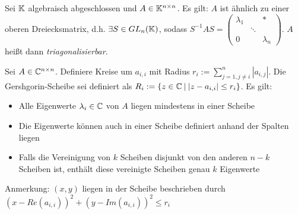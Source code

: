 \begin{satz}
	Sei $\mathbb{K}$ algebraisch abgeschlossen und $A \in \mathbb{K}^{n \times n}$. Es gilt: $A$ ist ähnlich zu einer oberen Dreiecksmatrix, d.h. $\exists S \in GL_n(\mathbb{K})$, sodass $S^{-1} A S = \left( \begin{smallmatrix} 
	\lambda_1 & & * \\
	& \ddots & \\
	0 & & \lambda_n
	\end{smallmatrix} \right)$. $A$ heißt dann \emph{triagonalisierbar}.
\end{satz}

\begin{satz}
	Sei $A \in \mathbb{C}^{n \times n}$. Definiere Kreise um $a_{i,i}$ mit Radius $r_i := \sum_{j = 1, j \neq i}^n |a_{i, j}|$. Die Gershgorin-Scheibe sei definiert als $R_i := \{z \in \mathbb{C} \medspace | \medspace |z -a_{i,i}| \leq r_i\}$. Es gilt:\begin{itemize}[noitemsep]
		\item Alle Eigenwerte $\lambda_i \in \mathbb{C} $ von $A$ liegen mindestens in einer Scheibe
		\item Die Eigenwerte können auch in einer Scheibe definiert anhand der Spalten liegen
		\item Falls die Vereinigung von $k$ Scheiben disjunkt von den anderen $n-k$ Scheiben ist, enthält diese vereinigte Scheiben genau $k$ Eigenwerte
	\end{itemize}

	Anmerkung: $(x,y)$ liegen in der Scheibe beschrieben durch $(x - Re(a_{i,i}))^2 + (y - Im(a_{i,i}))^2 \leq r_i$
\end{satz}


